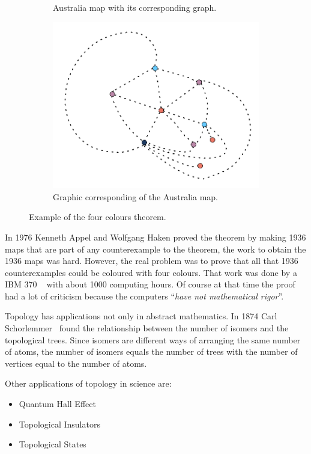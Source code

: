 \begin{figure}[h]
\begin{subfigure}[b]{0.28\linewidth}
    \caption{Australia map with its corresponding graph.}
  \end{subfigure}
    \begin{subfigure}[b]{0.28\linewidth}
    \includegraphics[width=\linewidth]{3/img/4_colors_australia_grafo}
    \caption{Graphic corresponding of the Australia map.}
  \end{subfigure}
  \caption{Example of the four colours theorem.}
  \label{australia}
\end{figure}

In 1976 Kenneth Appel and Wolfgang Haken proved the theorem by making 1936 maps
that are part of any counterexample to the theorem, the work to obtain the 1936
maps was hard.  However, the real problem was to prove that all that 1936
counterexamples could be coloured with four colours. That work was done by a
IBM 370 ~\cite{50cosas} with about \SI{1000}{} computing hours. Of course at
that time the proof had a lot of criticism because the computers ``\textit{have
not mathematical rigor}''.


Topology has applications not only in abstract mathematics.  In 1874 Carl
Schorlemmer~\cite{50cosas} found the relationship between the number of isomers
and the topological trees. Since isomers are different ways of arranging the
same number of atoms, the number of isomers equals the number of trees with the
number of vertices equal to the number of atoms.

Other applications of topology in science are:

\begin{itemize}
\item Quantum Hall Effect
\item Topological Insulators
\item Topological States
\end{itemize}


